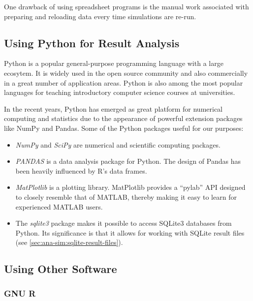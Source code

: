 One drawback of using spreadsheet programs is the manual work associated
with preparing and reloading data every time simulations are re-run.


\subsection{Using Python for Result Analysis}
\label{sec:ana-sim:using-python}

Python is a popular general-purpose programming language with a large ecosytem.
It is widely used in the open source community and also commercially in a great
number of application areas. Python is also among the most popular languages
for teaching introductory computer science courses at universities.

In the recent years, Python has emerged as great platform for numerical
computing and statistics due to the appearance of powerful extension packages
like NumPy and Pandas. Some of the Python packages useful for our purposes:

\begin{itemize}
  \item \textit{NumPy} and \textit{SciPy} are numerical and scientific computing
    packages.

  \item \textit{PANDAS} is a data analysis package for Python. The design of
    Pandas has been heavily influenced by R's data frames.

  \item \textit{MatPlotlib} is a plotting library. MatPlotlib provides a
    ``pylab'' API designed to closely resemble that of MATLAB, thereby making
    it easy to learn for experienced MATLAB users.

  \item The \textit{sqlite3} package makes it possible to access SQLite3
    databases from Python. Its significance is that it allows for working
    with {\opp} SQLite result files (see \ref{sec:ana-sim:sqlite-result-files}).

\end{itemize}


\subsection{Using Other Software}
\label{sec:ana-sim:alternative-tools}

\subsubsection{GNU R}
\label{sec:ana-sim:gnu-r}

